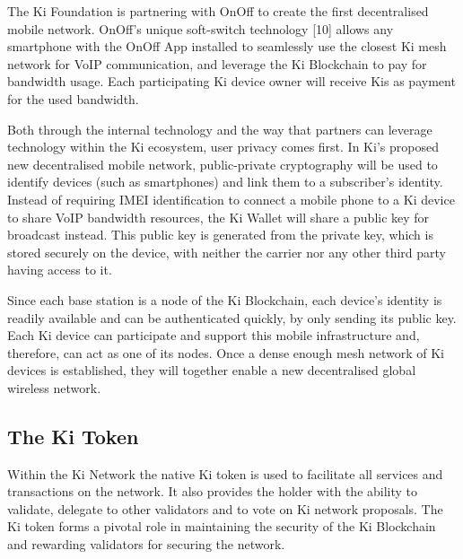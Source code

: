 The Ki Foundation is partnering with OnOff to create the first decentralised mobile network. OnOff’s unique soft-switch technology [10] allows any smartphone with the OnOff App installed to seamlessly use the closest Ki mesh network for VoIP communication, and leverage the Ki Blockchain to pay for bandwidth usage. Each participating Ki device owner will receive Kis as payment for the used bandwidth.

Both through the internal technology and the way that partners can leverage technology within the Ki ecosystem, user privacy comes first. In Ki’s proposed new decentralised mobile network, public-private cryptography will be used to identify devices (such as  smartphones) and link them to a subscriber’s identity. Instead of requiring IMEI identification to connect a mobile phone to a Ki device to share VoIP bandwidth resources, the Ki Wallet will share a public key for broadcast instead. This public key is generated from the private key, which is stored securely on the device, with neither the carrier nor any other third party having access to it. 

Since each base station is a node of the Ki Blockchain, each device’s identity is readily available and can be authenticated quickly, by only sending its public key. Each Ki device can participate and support this mobile infrastructure and, therefore, can act as one of its nodes. Once a dense enough mesh network of Ki devices is established, they will together enable a new decentralised global wireless network.

\subsection{The Ki Token}

Within the Ki Network the native Ki token is used to facilitate all services and transactions on the network. It also provides the holder with the ability to validate, delegate to other validators and to vote on Ki network proposals. The Ki token forms a pivotal role in maintaining the security of the Ki Blockchain and rewarding validators for securing the network. 

